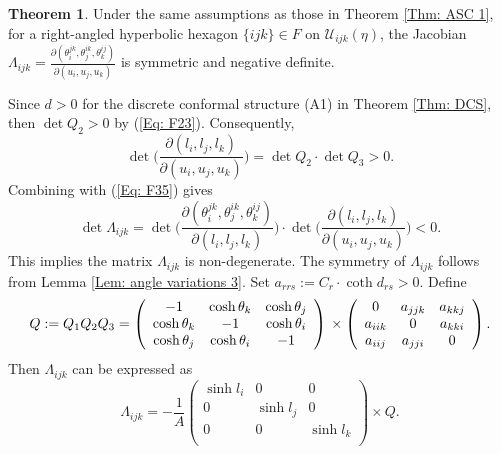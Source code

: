 \documentclass[12pt]{amsart}
\theoremstyle{definition}
\newtheorem{theorem}{Theorem}[section]
\begin{document}
\begin{theorem}\label{Thm: matrix negative 1}
Under the same assumptions as those in Theorem \ref{Thm: ASC 1},
for a right-angled hyperbolic hexagon $\{ijk\}\in F$ on $\mathcal{U}_{ijk}(\eta)$,
the Jacobian  $\Lambda_{ijk}=\frac{\partial(\theta^{jk}_i,\theta^{ik}_j,\theta^{ij}_k)}
{\partial(u_i,u_j,u_k)}$ is symmetric and negative definite.
\end{theorem}
\proof
Since $d>0$ for the discrete conformal structure (A1) in Theorem \ref{Thm: DCS},
then $\det Q_2>0$ by (\ref{Eq: F23}).
Consequently,
\begin{equation*}
\det\bigg(\frac{\partial(l_i,l_j,l_k)}
{\partial(u_i,u_j,u_k)}\bigg)
=\det Q_2\cdot \det Q_3>0.
\end{equation*}
Combining with (\ref{Eq: F35}) gives
\begin{equation}\label{Eq: F87}
\det\Lambda_{ijk}
=\det\bigg(\frac{\partial(\theta^{jk}_i,\theta^{ik}_j,\theta^{ij}_k)}
{\partial(l_i,l_j,l_k)}\bigg)\cdot\det\bigg(\frac{\partial(l_i,l_j,l_k)}
{\partial(u_i,u_j,u_k)}\bigg)<0.
\end{equation}
This implies the matrix $\Lambda_{ijk}$ is non-degenerate.
The symmetry of $\Lambda_{ijk}$ follows from Lemma \ref{Lem: angle variations 3}.
Set $a_{rrs}:=C_r\cdot\coth d_{rs}>0$.
Define
\begin{equation*}
Q:=Q_1Q_2Q_3=\left(
   \begin{array}{ccc}
     -1 & \cosh\theta_k & \cosh\theta_j \\
     \cosh\theta_k & -1 & \cosh\theta_i \\
     \cosh\theta_j & \cosh\theta_i & -1 \\
   \end{array}
 \right)\\
 \times
  \left(
   \begin{array}{ccc}
     0 & a_{jjk} & a_{kkj} \\
     a_{iik} & 0 & a_{kki} \\
     a_{iij} & a_{jji} & 0 \\
   \end{array}
   \right).
\end{equation*}
Then $\Lambda_{ijk}$ can be expressed as
\begin{equation*}
\Lambda_{ijk}=-\frac{1}{A}
 \left(
   \begin{array}{ccc}
     \sinh l_i & 0 & 0 \\
     0 & \sinh l_j & 0 \\
     0 & 0 & \sinh l_k \\
   \end{array}
 \right)\times Q.
\end{equation*}
\end{document}
